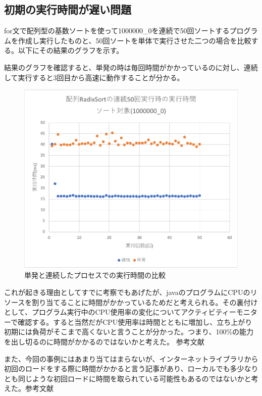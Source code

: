\documentclass[a4j,dvipdfmx]{jsreport}
\begin{document}
\subsection{初期の実行時間が遅い問題}
for文で配列型の基数ソートを使って1000000\_0を連続で50回ソートするプログラムを作成し実行したものと、50回ソートを単体で実行させた二つの場合を比較する。以下にその結果のグラフを示す。\par
結果のグラフを確認すると、単発の時は毎回時間がかかっているのに対し、連続して実行すると3回目から高速に動作することが分かる。
 \begin{figure}[htbp]
    \centering
    \includegraphics[keepaspectratio,width=\linewidth]{figure5.pdf}
    \caption{単発と連続したプロセスでの実行時間の比較}
    \label{fig:RS1}
\end{figure}
\clearpage
これが起きる理由としてすでに考察でもあげたが、javaのプログラムにCPUのリソースを割り当てることに時間がかかっているためだと考えられる。その裏付けとして、プログラム実行中のCPU使用率の変化についてアクティビティーモニターで確認する。すると当然だがCPU使用率は時間とともに増加し、立ち上がり初期には負荷がそこまで高くないと言うことが分かった。つまり、100\%の能力を出し切るのに時間がかかるのではないかと考えた。
参考文献 \cite{cord2} \cite{cord3} \par
また、今回の事例にはあまり当てはまらないが、インターネットライブラリから初回のロードをする際に時間がかかると言う記事があり、ローカルでも多少なりとも同じような初回ロードに時間を取られている可能性もあるのではないかと考えた。参考文献 \cite{cord4}
\end{document}
